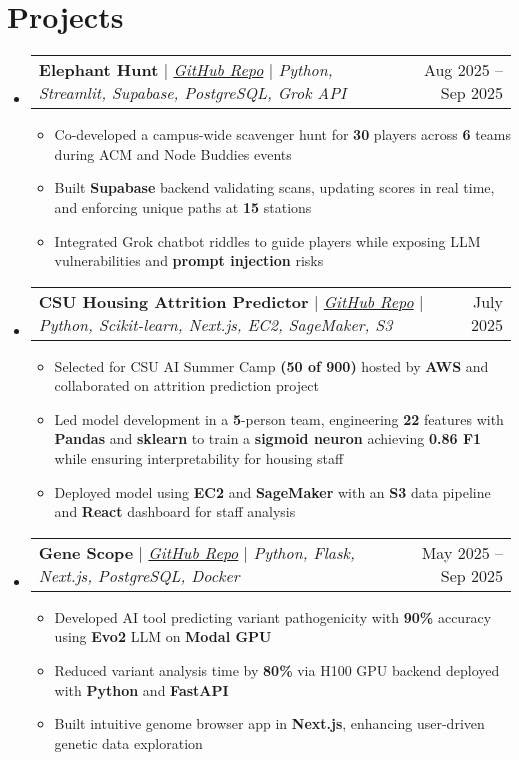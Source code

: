 \documentclass[letterpaper,11pt]{article}
\makeatletter
\newcommand{\resumeItem}[1]{
  \item\small{
    {#1 \vspace{-2pt}}
  }
}
\newcommand{\resumeProjectHeading}[2]{
    \item
    \begin{tabular*}{0.97\textwidth}{l@{\extracolsep{\fill}}r}
      \small#1 & #2 \\
    \end{tabular*}\vspace{-7pt}
}
\newcommand{\resumeSubHeadingListStart}{\begin{itemize}[leftmargin=0.15in, label={}]}
\newcommand{\resumeSubHeadingListEnd}{\end{itemize}}
\newcommand{\resumeItemListStart}{\begin{itemize}}
\newcommand{\resumeItemListEnd}{\end{itemize}\vspace{-5pt}}
\makeatother
\begin{document}
\section{Projects}
    \resumeSubHeadingListStart
    \resumeProjectHeading
          {\textbf{Elephant Hunt} $|$ \emph{\href{https://github.com/bebopkenny/Elephant-Hunt}{GitHub Repo}} $|$ \emph{Python, Streamlit, Supabase, PostgreSQL, Grok API}}{Aug 2025 -- Sep 2025}
          \resumeItemListStart
            \resumeItem{Co-developed a campus-wide scavenger hunt for \textbf{30} players across \textbf{6} teams during ACM and Node Buddies events}
            \resumeItem{Built \textbf{Supabase} backend validating scans, updating scores in real time, and enforcing unique paths at \textbf{15} stations}
            \resumeItem{Integrated Grok chatbot riddles to guide players while exposing LLM vulnerabilities and \textbf{prompt injection} risks}
          \resumeItemListEnd
          \resumeProjectHeading
          {\textbf{CSU Housing Attrition Predictor} $|$ \emph{\href{https://github.com/0x10jalencas/csu-summer-ai-camp-2025/tree/main}{GitHub Repo}} $|$ \emph{Python, Scikit-learn, Next.js, EC2, SageMaker, S3}}{July 2025}
          \resumeItemListStart
            \resumeItem{Selected for CSU AI Summer Camp \textbf{(50 of 900)} hosted by \textbf{AWS} and collaborated on attrition prediction project}
            \resumeItem{Led model development in a \textbf{5}-person team, engineering \textbf{22} features with \textbf{Pandas} and \textbf{sklearn} to train a \textbf{sigmoid neuron} achieving \textbf{0.86 F1} while ensuring interpretability for housing staff}
            \resumeItem{Deployed model using \textbf{EC2} and \textbf{SageMaker} with an \textbf{S3} data pipeline and \textbf{React} dashboard for staff analysis}
          \resumeItemListEnd
      \resumeProjectHeading
          {\textbf{Gene Scope} $|$ \emph{\href{http://www.github.com/bebopkenny/Gene-Scope}{GitHub Repo}} $|$ \emph{Python, Flask, Next.js, PostgreSQL, Docker}}{May 2025 -- Sep 2025}
          \resumeItemListStart
            \resumeItem{Developed AI tool predicting variant pathogenicity with \textbf{{90\%}} accuracy using \textbf{Evo2} LLM on \textbf{Modal GPU}}
            \resumeItem{Reduced variant analysis time by \textbf{{80\%}} via H100 GPU backend deployed with \textbf{Python} and \textbf{FastAPI}}
            \resumeItem{Built intuitive genome browser app in \textbf{Next.js}, enhancing user-driven genetic data exploration}
          \resumeItemListEnd
    \resumeSubHeadingListEnd
\end{document}
